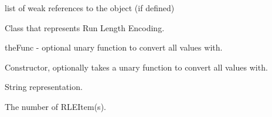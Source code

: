 \documentclass[letterpaper,10pt,english]{sphinxmanual}
\begin{document}
\begin{fulllineitems}
\begin{fulllineitems}
\end{fulllineitems}


\begin{fulllineitems}
\label{\detokenize{ref/LIS/core/Rle:TotalDepth.LIS.core.Rle.RLEItem.__weakref__}}
list of weak references to the object (if defined)

\end{fulllineitems}


\end{fulllineitems}


\begin{fulllineitems}
\label{\detokenize{ref/LIS/core/Rle:TotalDepth.LIS.core.Rle.RLE}}
Class that represents Run Length Encoding.

theFunc - optional unary function to convert all values with.

\begin{fulllineitems}
\label{\detokenize{ref/LIS/core/Rle:TotalDepth.LIS.core.Rle.RLE.__init__}}
Constructor, optionally takes a unary function to convert all values with.

\end{fulllineitems}


\begin{fulllineitems}
\label{\detokenize{ref/LIS/core/Rle:TotalDepth.LIS.core.Rle.RLE.__str__}}
String representation.

\end{fulllineitems}


\begin{fulllineitems}
\label{\detokenize{ref/LIS/core/Rle:TotalDepth.LIS.core.Rle.RLE.__len__}}
The number of RLEItem(s).

\end{fulllineitems}


\end{fulllineitems}
\end{document}
